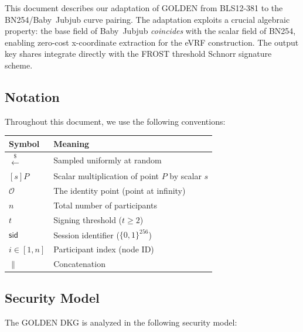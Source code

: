 \documentclass[11pt,a4paper]{article}
\newcommand{\sid}{\mathsf{sid}}
\newcommand{\getsr}{\xleftarrow{\$}}
\begin{document}
This document describes our adaptation of GOLDEN from BLS12-381 to the
BN254/Baby~Jubjub curve pairing. The adaptation exploits a crucial algebraic
property: the base field of Baby~Jubjub \emph{coincides} with the scalar field
of BN254, enabling zero-cost x-coordinate extraction for the eVRF
construction. The output key shares integrate directly with the FROST threshold
Schnorr signature scheme.

\subsection{Notation}

Throughout this document, we use the following conventions:

\begin{center}
\renewcommand{\arraystretch}{1.2}
\begin{tabular}{@{}ll@{}}
\toprule
\textbf{Symbol} & \textbf{Meaning} \\
\midrule
$\getsr$ & Sampled uniformly at random \\
$[s]P$ & Scalar multiplication of point $P$ by scalar $s$ \\
$\mathcal{O}$ & The identity point (point at infinity) \\
$n$ & Total number of participants \\
$t$ & Signing threshold ($t \ge 2$) \\
$\sid$ & Session identifier ($\{0,1\}^{256}$) \\
$i \in [1, n]$ & Participant index (node ID) \\
$\|$ & Concatenation \\
\bottomrule
\end{tabular}
\end{center}

\subsection{Security Model}
\label{sec:secmodel-intro}

The GOLDEN DKG is analyzed in the following security model:
\end{document}
